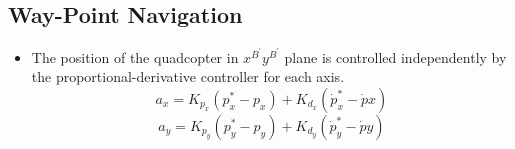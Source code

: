 \documentclass[10pt]{beamer}
\begin{document}
\subsection*{Way-Point Navigation}
\begin{frame}
	\begin{itemize}
		\item  The position of the quadcopter in $x^{B^{\prime}}y^{B^{\prime}}$ plane is controlled independently by  the proportional-derivative controller for each axis.
		      \begin{equation*}\label{x-pos-control}
			      a_{x} = K_{p_{x}}\left(p_{x}^{*}-p_{x}\right)+K_{d_{x}}\left(\dot{p}_{x}^{*}-\dot{p}{x}\right)
		      \end{equation*}
		      \begin{equation*}\label{y-pos-control}
			      a_{y} = K_{p_{y}}\left(p_{y}^{*}-p_{y}\right)+K_{d_{y}}\left(\dot{p}_{y}^{*}-\dot{p}{y}\right)
		      \end{equation*}
	\end{itemize}


\end{frame}
\end{document}
